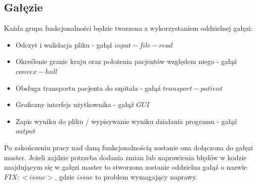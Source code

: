 \documentclass{article}
\begin{document}
\subsection{Gałęzie}
Każda grupa funkcjonalności będzie tworzona z wykorzystaniem oddzielnej gałęzi:
\begin{itemize}
\item Odczyt i walidacja pliku - gałąź \(input-file-read\)
\item Określenie granic kraju oraz położenia pacjentów względem niego - gałąź \(convex-hull\)
\item Obsługa transportu pacjenta do szpitala - gałąź \(transport-patient\)
\item Graficzny interfejs użytkownika - gałąź \(GUI\)
\item Zapis wyniku do pliku / wypisywanie wyniku działania programu - gałąź \(output\)
\end{itemize}
Po zakończeniu pracy nad daną funkcjonalnością zostanie ona dołączona do gałęzi master. Jeżeli zajdzie potrzeba dodania zmian lub naprawienia błędów w kodzie znajdującym się w gałęzi master to stworzona zostanie oddzielna gałąź o nazwie \(FIX:<issue>\), gdzie \(issue\) to problem wymagający naprawy.
\end{document}
